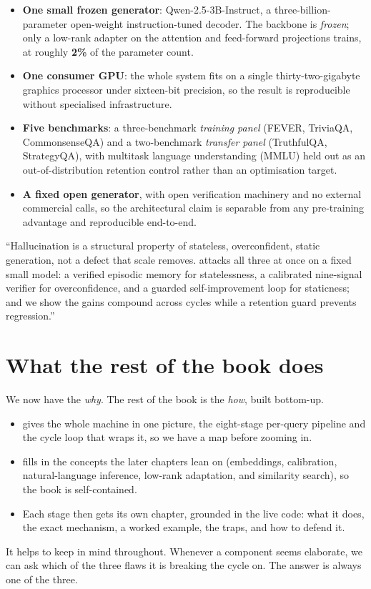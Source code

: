 \begin{itemize}[leftmargin=1.4em]
  \item \textbf{One small frozen generator}: Qwen-2.5-3B-Instruct, a
  three-billion-parameter open-weight instruction-tuned decoder. The backbone is
  \emph{frozen}; only a low-rank adapter on the attention and feed-forward
  projections trains, at roughly \textbf{2\%} of the parameter count.
  \item \textbf{One consumer GPU}: the whole system fits on a single
  thirty-two-gigabyte graphics processor under sixteen-bit precision, so the
  result is reproducible without specialised infrastructure.
  \item \textbf{Five benchmarks}: a three-benchmark \emph{training panel}
  (FEVER, TriviaQA, CommonsenseQA) and a two-benchmark \emph{transfer panel}
  (TruthfulQA, StrategyQA), with multitask language understanding (MMLU) held
  out as an out-of-distribution retention control rather than an optimisation
  target.
  \item \textbf{A fixed open generator}, with open verification machinery and no
  external commercial calls, so the architectural claim is separable from any
  pre-training advantage and reproducible end-to-end.
\end{itemize}

\begin{defence}
``Hallucination is a structural property of stateless, overconfident, static
generation, not a defect that scale removes. \caem{} attacks all three at once
on a fixed small model: a verified episodic memory for statelessness, a
calibrated nine-signal verifier for overconfidence, and a guarded
self-improvement loop for staticness; and we show the gains compound across
cycles while a retention guard prevents regression.''
\end{defence}

\section{What the rest of the book does}

We now have the \emph{why}. The rest of the book is the \emph{how}, built
bottom-up.

\begin{itemize}[leftmargin=1.4em]
  \item {} gives the whole machine in one picture, the
  eight-stage per-query pipeline and the cycle loop that wraps it, so we have a
  map before zooming in.
  \item {} fills in the concepts the later chapters lean on
  (embeddings, calibration, natural-language inference, low-rank adaptation, and
  similarity search), so the book is self-contained.
  \item Each stage then gets its own chapter, grounded in the live code: what it
  does, the exact mechanism, a worked example, the traps, and how to defend it.
\end{itemize}

It helps to keep  in mind throughout. Whenever a
component seems elaborate, we can ask which of the three flaws it is breaking the
cycle on. The answer is always one of the three.

